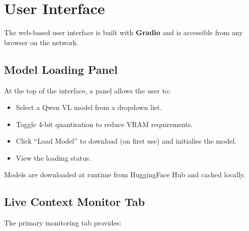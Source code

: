 \documentclass[12pt,a4paper]{article}
\begin{document}
\section{User Interface}

The web-based user interface is built with \textbf{Gradio} and is accessible from any browser on the network.

\subsection{Model Loading Panel}

At the top of the interface, a panel allows the user to:

\begin{itemize}[noitemsep]
    \item Select a Qwen VL model from a dropdown list.
    \item Toggle 4-bit quantisation to reduce VRAM requirements.
    \item Click ``Load Model'' to download (on first use) and initialise the model.
    \item View the loading status.
\end{itemize}

Models are downloaded at runtime from HuggingFace Hub and cached locally.

\subsection{Live Context Monitor Tab}

The primary monitoring tab provides:
\end{document}
